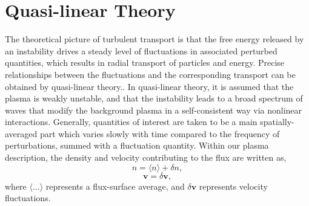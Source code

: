 \documentclass[12pt]{article}
\numberwithin{equation}{subsection}
\begin{document}
\section{Quasi-linear Theory}
   \quad The theoretical picture of turbulent transport is that the free energy released by an instability drives a steady level of
fluctuations in associated perturbed quantities, which results in radial transport of particles and energy. Precise relationships
between the fluctuations and the corresponding transport can be obtained by quasi-linear theory.\cite{WessonD}. In quasi-linear
theory, it is assumed that the plasma is weakly unstable, and that the instability leads to a broad spectrum of waves that modify
the background plasma in a self-consistent way via nonlinear interactions\cite{GurnBhatA}. Generally, quantities of interest are taken
to be a main spatially-averaged part which varies slowly with time compared to the frequency of perturbations, summed with a fluctuation
quantity. Within our plasma description, the density and velocity contributing to the flux are written as, 
   \begin{equation}
      n = \langle n \rangle + \delta n,
   \end{equation}
   \begin{equation}
      \bm{v} = \delta \bm{v},
   \end{equation}
where $\langle ... \rangle$ represents a flux-surface average, and $\delta \bm{v}$ represents velocity fluctuations.
\end{document}
